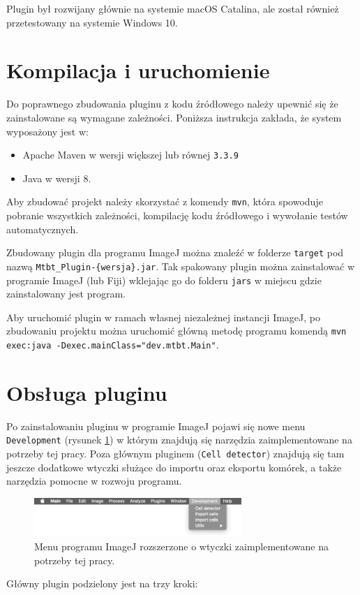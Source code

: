 \documentclass[declaration,shortabstract,mgr]{iithesis}
\begin{document}
Plugin był rozwijany głównie na systemie macOS Catalina, ale został również przetestowany na systemie Windows 10. 

\section{Kompilacja i uruchomienie}

Do poprawnego zbudowania pluginu z kodu źródłowego należy upewnić się że zainstalowane są wymagane zależności. Poniższa instrukcja zakłada, że system wyposażony jest w:

\begin{itemize}
  \item Apache Maven w wersji większej lub równej \texttt{3.3.9}
  \item Java w wersji 8.
\end{itemize}

Aby zbudować projekt należy skorzystać z komendy \texttt{mvn}, która spowoduje pobranie wszystkich zależności,  kompilację kodu źródłowego i wywołanie testów automatycznych.

Zbudowany plugin dla programu ImageJ można znaleźć w folderze \texttt{target} pod nazwą \texttt{Mtbt\_Plugin-\{wersja\}.jar}. Tak spakowany plugin można zainstalować w programie ImageJ (lub Fiji) wklejając go do folderu \texttt{jars} w miejscu gdzie zainstalowany jest program.

Aby uruchomić plugin w ramach własnej niezależnej instancji ImageJ, po zbudowaniu projektu można uruchomić główną metodę programu komendą
\linebreak\texttt{mvn exec:java -Dexec.mainClass="dev.mtbt.Main"}.


\section{Obsługa pluginu}

Po zainstalowaniu pluginu w programie ImageJ pojawi się nowe menu \texttt{Development} (rysunek \ref{fig:ui-menu}) w którym znajdują się narzędzia zaimplementowane na potrzeby tej pracy. Poza głównym pluginem (\texttt{Cell detector}) znajdują się tam jeszcze dodatkowe wtyczki służące do importu oraz eksportu komórek, a także narzędzia pomocne w rozwoju programu.
\begin{figure}
  \centering
  \includegraphics[width=0.7\textwidth]{images/ui-menu.png}
  \caption{Menu programu ImageJ rozszerzone o wtyczki zaimplementowane na potrzeby tej pracy.}
  \label{fig:ui-menu}
\end{figure}
Główny plugin podzielony jest na trzy kroki:
\end{document}
